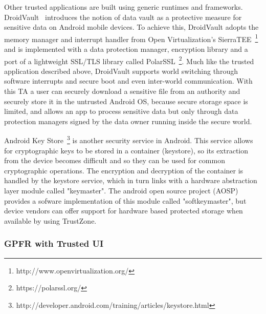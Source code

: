 Other trusted applications are built using generic runtimes and frameworks. DroidVault~\cite{li2014droidvault} introduces the notion of data vault as a protective measure for sensitive data on Android mobile devices. %
To achieve this, DroidVault adopts the memory manager and interrupt handler from Open Virtualization's SierraTEE~\footnote{http://www.openvirtualization.org/} and is implemented with a data protection manager, encryption library and a port of a lightweight SSL/TLS library called PolarSSL~\footnote{https://polarssl.org/}. Much like the trusted application described above, DroidVault supports world switching through software interrupts and secure boot and even inter-world communication. With this TA a user can securely download a sensitive file from an authority and securely store it in the untrusted Android OS, because secure storage space is limited, and allows an app to process sensitive data but only through data protection managers signed by the data owner running inside the secure world. %

Android Key Store~\footnote{http://developer.android.com/training/articles/keystore.html} is another security service in Android. This service allows for cryptographic keys to be stored in a container (keystore), so its extraction from the device becomes difficult and so they can be used for common cryptographic operations. The encryption and decryption of the container is handled by the keystore service, which in turn links with a hardware abstraction layer module called "keymaster". The android open source project (AOSP) provides a sofware implementation of this module called "softkeymaster", but device vendors can offer support for hardware based protected storage when available by using TrustZone.


\subsubsection{GPFR with Trusted UI}

